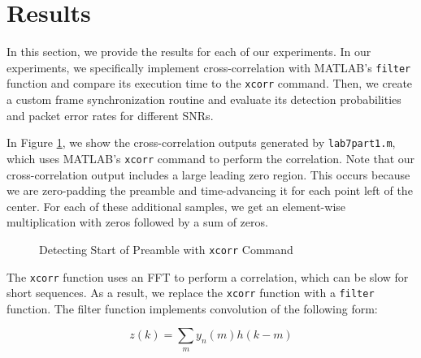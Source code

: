 \documentclass{article}
\begin{document}
\section{Results}

In this section, we provide the results for each of our experiments. In our experiments, we specifically implement cross-correlation with MATLAB's \texttt{filter} function and compare its execution time to the \texttt{xcorr} command. Then, we create a custom frame synchronization routine and evaluate its detection probabilities and packet error rates for different SNRs.

In Figure \ref{fig::xcorr_preamble_detect}, we show the cross-correlation outputs generated by \texttt{lab7part1.m}, which uses MATLAB's \texttt{xcorr} command to perform the correlation. Note that our cross-correlation output includes a large leading zero region. This occurs because we are zero-padding the preamble and time-advancing it for each point left of the center. For each of these additional samples, we get an element-wise multiplication with zeros followed by a sum of zeros.

\begin{figure}[H]
	\centerline{}
	\caption{Detecting Start of Preamble with \texttt{xcorr} Command}
	\label{fig::xcorr_preamble_detect}
\end{figure}

The \texttt{xcorr} function uses an FFT to perform a correlation, which can be slow for short sequences. As a result, we replace the \texttt{xcorr} function with a \texttt{filter} function. The filter function implements convolution of the following form:

\begin{equation}
	z(k) = \sum_{m}{y_n(m)h(k - m)}
\end{equation}
\end{document}
